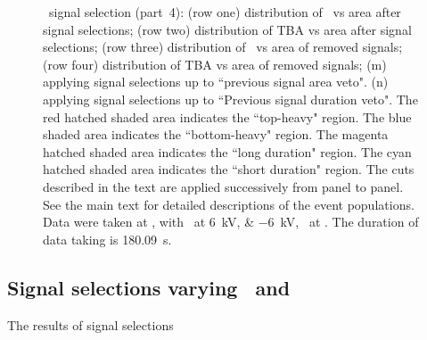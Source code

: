 \begin{landscape}
\begin{figure}[!p]
\begin{subfigure}[t]{0.32\textwidth}
	\caption{}
	\label{fig:signal selection 16}
\end{subfigure}
	\caption[\gtest\ signal selection (part~4).]{\gtest\ signal selection (part~4): 
			(row one) distribution of \rpdshort\ vs area after signal selections;
			(row two) distribution of TBA vs area after signal selections;
			(row three) distribution of \rpdshort\ vs area of removed signals;
			(row four) distribution of TBA vs area of removed signals;
		(m) applying signal selections up to ``previous signal area veto".
				(n) applying signal selections up to ``Previous signal duration veto".
		The red hatched shaded area indicates the ``top-heavy" region.
		The blue shaded area indicates the ``bottom-heavy" region.
		The magenta hatched shaded area indicates the ``long duration" region.
		The cyan hatched shaded area indicates the ``short duration" region.
				The cuts described in the text are applied successively from panel to panel. See the main text for detailed descriptions of the event populations.
		Data were taken at , with \opvtvb\ at \SIlist{+6;-6}{kV}, \opgd\ at \standarddensity . The duration of data taking is \SI{180.09}{\s}.
	}
	\label{fig:signal selection l4}
\end{figure}
\end{landscape}


\subsection{Signal selections varying \opdv\ and \opgd }
The results of signal selections 

